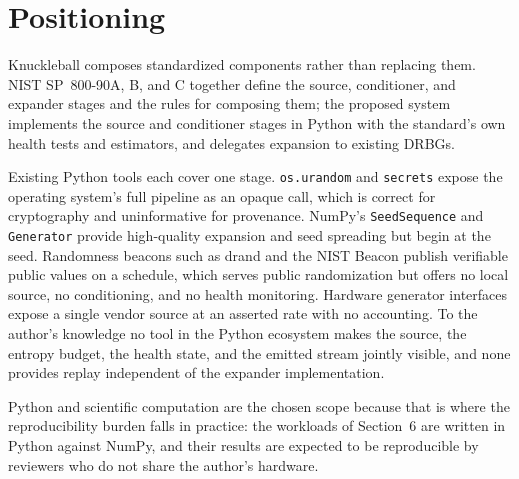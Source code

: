 \section{Positioning}
 
Knuckleball composes standardized components rather than replacing them. NIST
SP~800-90A, B, and C \citep{barker2015,turan2018,barker2024} together define the
source, conditioner, and expander stages and the rules for composing them; the proposed
system implements the source and conditioner stages in Python with the standard's own
health tests and estimators, and delegates expansion to existing DRBGs.
 
Existing Python tools each cover one stage. \texttt{os.urandom} and \texttt{secrets}
expose the operating system's full pipeline as an opaque call, which is correct for
cryptography and uninformative for provenance. NumPy's \texttt{SeedSequence} and
\texttt{Generator} \citep{harris2020} provide high-quality expansion and seed spreading
but begin at the seed. Randomness beacons such as drand and the NIST Beacon
\citep{syta2017,kelsey2019} publish verifiable public values on a schedule, which
serves public randomization but offers no local source, no conditioning, and no health
monitoring. Hardware generator interfaces expose a single vendor source at an asserted
rate with no accounting. To the author's knowledge no tool in the Python ecosystem
makes the source, the entropy budget, the health state, and the emitted stream jointly
visible, and none provides replay independent of the expander implementation.
 
Python and scientific computation are the chosen scope because that is where the
reproducibility burden falls in practice: the workloads of Section~6 are written in
Python against NumPy, and their results are expected to be reproducible by reviewers
who do not share the author's hardware.